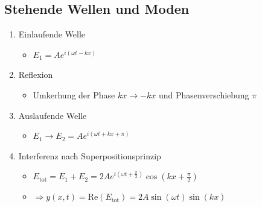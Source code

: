 \documentclass{beamer}
\begin{document}
\subsection{Stehende Wellen und Moden}
\begin{frame}
	\begin{enumerate}
		\item Einlaufende Welle
		      \begin{itemize}
			      \item $E_1=A e^{i(\omega t - kx)}$
		      \end{itemize}
		\item Reflexion
		      \begin{itemize}
			      \item Umkerhung der Phase $kx \rightarrow -kx$ und Phasenverschiebung $\pi$
		      \end{itemize}
		\item Auslaufende Welle
		      \begin{itemize}
			      \item $E_1 \rightarrow E_2=A e^{i(\omega t + kx + \pi)}$
		      \end{itemize}
		\item Interferenz nach Superpositionsprinzip
		      \begin{itemize}
			      \item $E_{\text{tot}} = E_1 + E_2 = 2Ae^{i(\omega t+\frac{\pi}{2})}\cos{(kx+\frac{\pi}{2})}$
			      \item $\Rightarrow y(x,t)=\text{Re}(E_{\text{tot}})=2A\sin{(\omega t)}\sin{(kx)}$
		      \end{itemize}
	\end{enumerate}
\end{frame}
\end{document}
